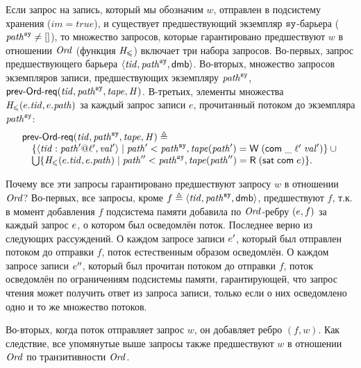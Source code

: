 Если запрос на запись, который мы обозначим $w$,
отправлен в подсистему хранения ($im = \mathit{true}$),
и существует предшествующий экземпляр $\mathtt{sy}$-барьера ($\mathit{path}^{\mathtt{sy}} \neq []$),
то множество запросов, которые гарантировано предшествуют $w$ в отношении $\mathit{Ord}$
(функция $\mathit{H}_{\leqslant}$) включает три набора запросов.
Во-первых, запрос предшествующего барьера $\langle \mathit{tid}, \mathit{path}^{\mathtt{sy}}, {\sf dmb} \rangle$.
Во-вторых, множество запросов экземпляров записи, предшествующих экземпляру $\mathit{path}^{\mathtt{sy}}$,
$\textup{\sf prev-Ord-req}(\mathit{tid}, \mathit{path}^{\mathtt{sy}}, \mathit{tape}, \mathit{H})$.
В-третьих, элементы множества $\mathit{H}_{\leqslant}(e.\mathit{tid}, e.\mathit{path})$ за каждый запрос записи $e$,
прочитанный потоком до экземпляра $\mathit{path}^{\mathtt{sy}}$:
\[\begin{array}{l}
\textup{\sf prev-Ord-req}(\mathit{tid}, \mathit{path}^{\mathtt{sy}}, \mathit{tape}, \mathit{H}) \triangleq\\
\quad \{ \langle \mathit{tid}:\mathit{path}'@\ell',\mathit{val}' \rangle \mid \mathit{path}'  < \mathit{path}^{\mathtt{sy}},
          \mathit{tape}(\mathit{path}' ) = \textsf{W} \; (\mathsf{com} \; \_ \; \ell' \; \mathit{val}') \} \cup {}\\
\quad \bigcup \{ \mathit{H}_{\leqslant}(e.\mathit{tid}, e.\mathit{path}) \mid
                   \mathit{path}'' < \mathit{path}^{\mathtt{sy}}, \mathit{tape}(\mathit{path}'') = \textsf{R} \; (\mathsf{sat} \; \mathsf{com} \; e) \}. 
\end{array}\]

Почему все эти запросы гарантировано предшествуют запросу $w$ в отношении $\mathit{Ord}$?
Во-первых, все запросы, кроме $f \triangleq \langle \mathit{tid}, \mathit{path}^{\mathtt{sy}}, {\sf dmb} \rangle$, предшествуют $f$,
т.к. в момент добавления $f$ подсистема памяти добавила по $\mathit{Ord}$-ребру $(e, f)$ за
каждый запрос $e$, о котором был осведомлён поток.
Последнее верно из следующих рассуждений.
О каждом запросе записи $e'$, который был отправлен потоком до отправки $f$,
поток естественным образом осведомлён.
О каждом запросе записи $e''$, который был прочитан потоком до отправки $f$,
поток осведомлён по ограничениям подсистемы памяти, гарантирующей, что
запрос чтения может получить ответ из запроса записи, только если о них осведомлено
одно и то же множество потоков.

Во-вторых, когда поток отправляет запрос $w$, он добавляет ребро $(f, w)$.
Как следствие, все упомянутые выше запросы также предшествуют $w$ в отношении $\mathit{Ord}$
по транзитивности $\mathit{Ord}$.


